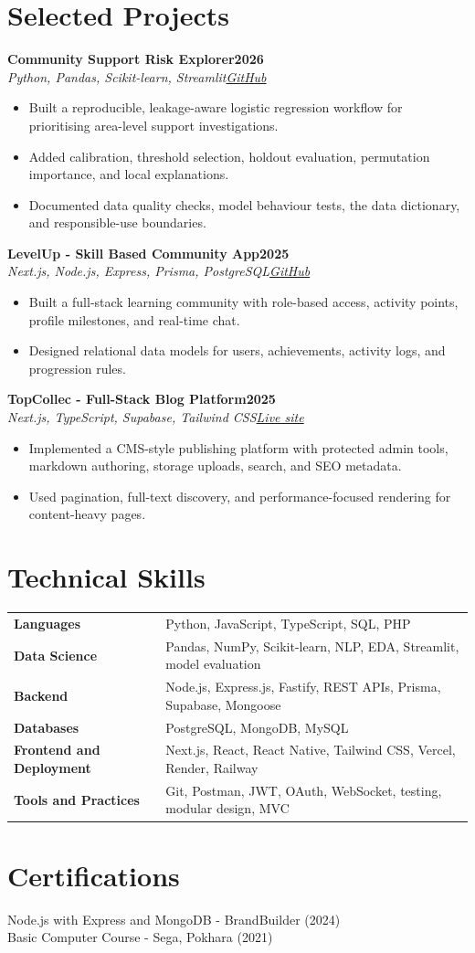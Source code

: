 \documentclass[10pt,a4paper]{article}
\newcommand{\entry}[4]{%
  \textbf{#1}\hfill\textbf{#2}\\
  \textit{#3}\hfill\textit{#4}\par
}
\begin{document}
\section*{Selected Projects}
\entry{Community Support Risk Explorer}{2026}{Python, Pandas, Scikit-learn, Streamlit}{\href{https://github.com/BishalAdhikari0123/community-support-risk-explorer}{GitHub}}
\begin{itemize}
  \item Built a reproducible, leakage-aware logistic regression workflow for prioritising area-level support investigations.
  \item Added calibration, threshold selection, holdout evaluation, permutation importance, and local explanations.
  \item Documented data quality checks, model behaviour tests, the data dictionary, and responsible-use boundaries.
\end{itemize}

\entry{LevelUp - Skill Based Community App}{2025}{Next.js, Node.js, Express, Prisma, PostgreSQL}{\href{https://github.com/BishalAdhikari0123/LevelUp}{GitHub}}
\begin{itemize}
  \item Built a full-stack learning community with role-based access, activity points, profile milestones, and real-time chat.
  \item Designed relational data models for users, achievements, activity logs, and progression rules.
\end{itemize}

\entry{TopCollec - Full-Stack Blog Platform}{2025}{Next.js, TypeScript, Supabase, Tailwind CSS}{\href{https://topcollec.vercel.app/}{Live site}}
\begin{itemize}
  \item Implemented a CMS-style publishing platform with protected admin tools, markdown authoring, storage uploads, search, and SEO metadata.
  \item Used pagination, full-text discovery, and performance-focused rendering for content-heavy pages.
\end{itemize}

\section*{Technical Skills}
\begin{tabularx}{\textwidth}{@{}>{\bfseries}l X@{}}
Languages & Python, JavaScript, TypeScript, SQL, PHP \\
Data Science & Pandas, NumPy, Scikit-learn, NLP, EDA, Streamlit, model evaluation \\
Backend & Node.js, Express.js, Fastify, REST APIs, Prisma, Supabase, Mongoose \\
Databases & PostgreSQL, MongoDB, MySQL \\
Frontend and Deployment & Next.js, React, React Native, Tailwind CSS, Vercel, Render, Railway \\
Tools and Practices & Git, Postman, JWT, OAuth, WebSocket, testing, modular design, MVC
\end{tabularx}

\section*{Certifications}
Node.js with Express and MongoDB - BrandBuilder (2024)\\
Basic Computer Course - Sega, Pokhara (2021)
\end{document}
